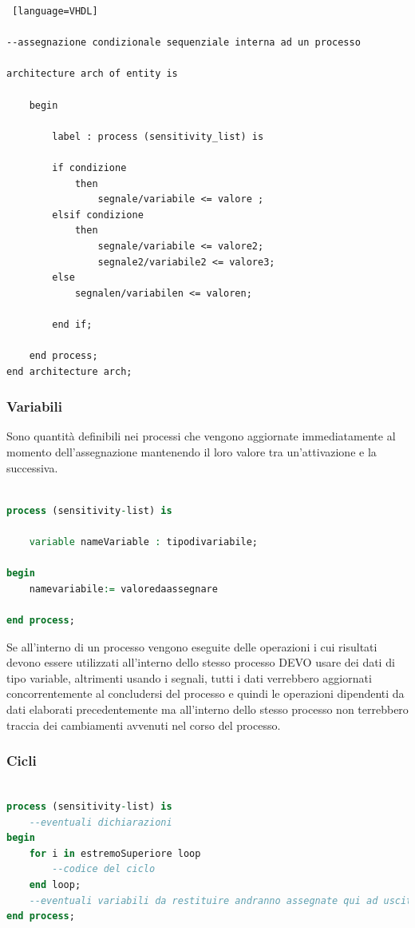 \documentclass[a4paper]{book}
\begin{document}
\begin{lstlisting} [language=VHDL]

--assegnazione condizionale sequenziale interna ad un processo

architecture arch of entity is

	begin

		label : process (sensitivity_list) is
	
		if condizione 
			then 
				segnale/variabile <= valore ;
		elsif condizione 
			then 
				segnale/variabile <= valore2;
				segnale2/variabile2 <= valore3;
		else 
			segnalen/variabilen <= valoren;
		
		end if;	
		
	end process;
end architecture arch;		

\end{lstlisting}

\subsubsection{Variabili}

Sono quantità definibili nei processi che vengono aggiornate immediatamente al momento dell'assegnazione mantenendo il loro valore tra un'attivazione e la successiva.

\begin{lstlisting}[language=VHDL]

process (sensitivity-list) is

	variable nameVariable : tipodivariabile;
	
begin
	namevariabile:= valoredaassegnare

end process;


\end{lstlisting}
Se all'interno di un processo vengono eseguite delle operazioni i cui risultati devono essere utilizzati all'interno dello stesso processo DEVO usare dei dati di tipo variable, altrimenti usando i segnali, tutti i dati verrebbero aggiornati concorrentemente al concludersi del processo e quindi le operazioni dipendenti da dati elaborati precedentemente ma all'interno dello stesso processo non terrebbero traccia dei cambiamenti avvenuti nel corso del processo.

\subsubsection{Cicli}


\begin{lstlisting}[language=VHDL]

process (sensitivity-list) is
	--eventuali dichiarazioni
begin 
	for i in estremoSuperiore loop
		--codice del ciclo
	end loop;
	--eventuali variabili da restituire andranno assegnate qui ad uscite o segnali cos' da non essere perse all'uscita dal ciclo.
end process;
\end{lstlisting}
\end{document}
